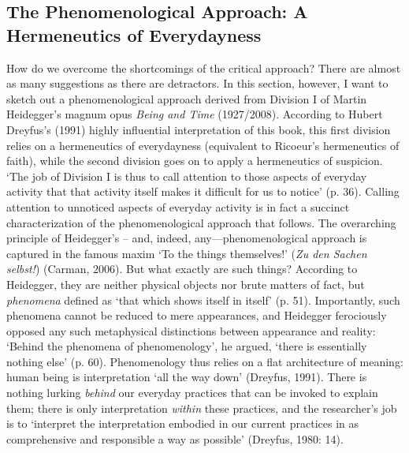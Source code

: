 \begin{adjmulticols}{2}{0mm}{0mm}
\chapter{The Phenomenological Approach: A Hermeneutics of Everydayness}
How do we overcome the shortcomings of the critical approach? There are almost as many suggestions as there are detractors. In this section, however, I want to sketch out a phenomenological approach derived from Division I of Martin Heidegger’s magnum opus \textit{Being and Time} (1927/2008). According to Hubert Dreyfus’s (1991) highly influential interpretation of this book, this first division relies on a hermeneutics of everydayness (equivalent to Ricoeur’s hermeneutics of faith), while the second division goes on to apply a hermeneutics of suspicion. ‘The job of Division I is thus to call attention to those aspects of everyday activity that that activity itself makes it difficult for us to notice’ (p. 36). Calling attention to unnoticed aspects of everyday activity is in fact a succinct characterization of the phenomenological approach that follows. The overarching principle of Heidegger’s – and, indeed, any—phenomenological approach is captured in the famous maxim ‘To the things themselves!’ (\textit{Zu den Sachen selbst!}) (Carman, 2006). But what exactly are such things? According to Heidegger, they are neither physical objects nor brute matters of fact, but \textit{phenomena} defined as ‘that which shows itself in itself’ (p. 51). Importantly, such phenomena cannot be reduced to mere appearances, and Heidegger ferociously opposed any such metaphysical distinctions between appearance and reality: ‘Behind the phenomena of phenomenology’, he argued, ‘there is essentially nothing else’ (p. 60). Phenomenology thus relies on a flat architecture of meaning: human being is interpretation ‘all the way down’ (Dreyfus, 1991). There is nothing lurking \textit{behind} our everyday practices that can be invoked to explain them; there is only interpretation \textit{within} these practices, and the researcher’s job is to ‘interpret the interpretation embodied in our current practices in as comprehensive and responsible a way as possible’ (Dreyfus, 1980: 14). 

\end{adjmulticols}
